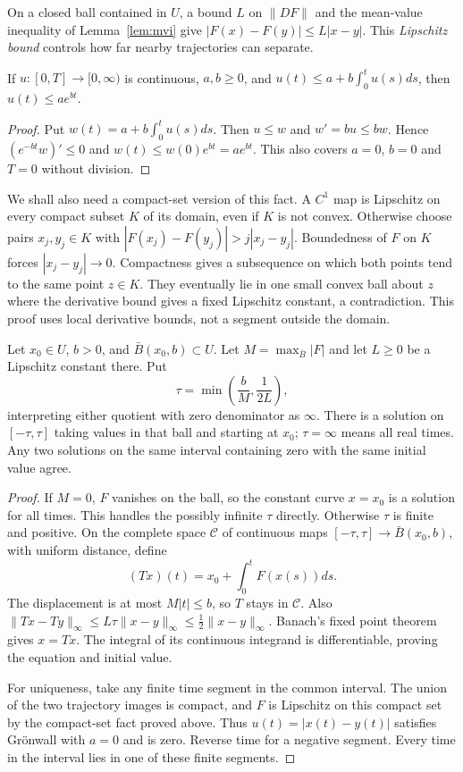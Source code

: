 On a closed ball contained in $U$, a bound $L$ on $\|DF\|$ and the mean-value inequality of Lemma~\ref{lem:mvi} give $|F(x)-F(y)|\le L|x-y|$. This \emph{Lipschitz bound} controls how far nearby trajectories can separate.

\begin{lemma}[Gr\"onwall]\label{lem:gronwall}
If $u:[0,T]\to[0,\infty)$ is continuous, $a,b\ge0$, and $u(t)\le a+b\int_0^t u(s)ds$, then $u(t)\le ae^{bt}$.
\end{lemma}

\begin{proof}
Put $w(t)=a+b\int_0^t u(s)ds$. Then $u\le w$ and $w'=bu\le bw$. Hence $(e^{-bt}w)'\le0$ and $w(t)\le w(0)e^{bt}=ae^{bt}$. This also covers $a=0$, $b=0$ and $T=0$ without division.
\end{proof}

We shall also need a compact-set version of this fact. A $C^1$ map is Lipschitz on every compact subset $K$ of its domain, even if $K$ is not convex. Otherwise choose pairs $x_j,y_j\in K$ with $|F(x_j)-F(y_j)|>j|x_j-y_j|$. Boundedness of $F$ on $K$ forces $|x_j-y_j|\to0$. Compactness gives a subsequence on which both points tend to the same point $z\in K$. They eventually lie in one small convex ball about $z$ where the derivative bound gives a fixed Lipschitz constant, a contradiction. This proof uses local derivative bounds, not a segment outside the domain.

\begin{theorem}\label{thm:picard}
Let $x_0\in U$, $b>0$, and $\bar B(x_0,b)\subset U$. Let $M=\max_{\bar B}|F|$ and let $L\ge0$ be a Lipschitz constant there. Put
\[
\tau=\min\left(\frac bM,\frac1{2L}\right),
\]
interpreting either quotient with zero denominator as $\infty$. There is a solution on $[-\tau,\tau]$ taking values in that ball and starting at $x_0$; $\tau=\infty$ means all real times. Any two solutions on the same interval containing zero with the same initial value agree.
\end{theorem}

\begin{proof}
If $M=0$, $F$ vanishes on the ball, so the constant curve $x=x_0$ is a solution for all times. This handles the possibly infinite $\tau$ directly. Otherwise $\tau$ is finite and positive. On the complete space $\mathcal C$ of continuous maps $[-\tau,\tau]\to\bar B(x_0,b)$, with uniform distance, define
\[
(Tx)(t)=x_0+\int_0^tF(x(s))ds.
\]
The displacement is at most $M|t|\le b$, so $T$ stays in $\mathcal C$. Also $\|Tx-Ty\|_\infty\le L\tau\|x-y\|_\infty\le\tfrac12\|x-y\|_\infty$. Banach's fixed point theorem gives $x=Tx$. The integral of its continuous integrand is differentiable, proving the equation and initial value.

For uniqueness, take any finite time segment in the common interval. The union of the two trajectory images is compact, and $F$ is Lipschitz on this compact set by the compact-set fact proved above. Thus $u(t)=|x(t)-y(t)|$ satisfies Gr\"onwall with $a=0$ and is zero. Reverse time for a negative segment. Every time in the interval lies in one of these finite segments.
\end{proof}

